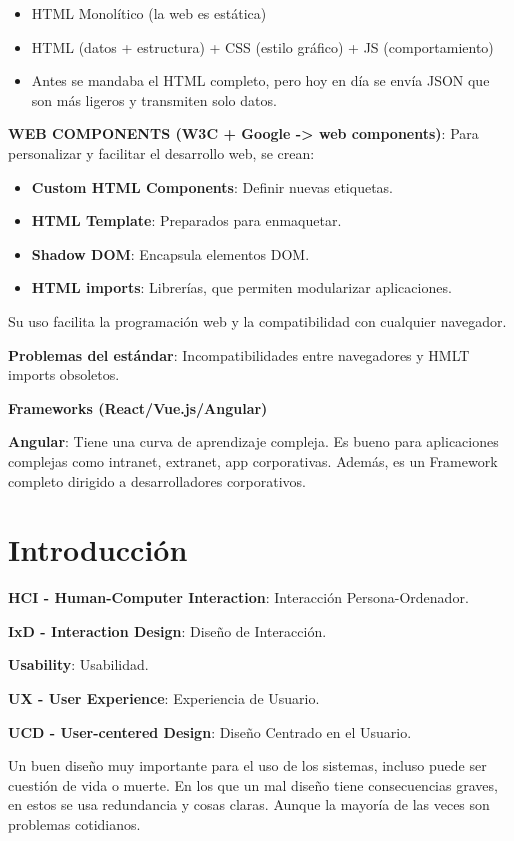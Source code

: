 \documentclass[12pt]{report} %
\begin{document}
\begin{itemize}
\item HTML Monolítico (la web es estática)
\item HTML (datos + estructura) + CSS (estilo gráfico) + JS (comportamiento)
\item Antes se mandaba el HTML completo, pero hoy en día se envía JSON que son más ligeros y transmiten solo datos.
\end{itemize}

\textbf{WEB COMPONENTS (W3C + Google -\textgreater{} web components)}:
Para personalizar y facilitar el desarrollo web, se crean:

\begin{itemize}
\item
  \textbf{Custom HTML Components}: Definir nuevas etiquetas.
\item
  \textbf{HTML Template}: Preparados para enmaquetar.
\item
  \textbf{Shadow DOM}: Encapsula elementos DOM.
\item
  \textbf{HTML imports}: Librerías, que permiten modularizar
  aplicaciones.
\end{itemize}

Su uso facilita la programación web y la compatibilidad con cualquier
navegador.

\textbf{Problemas del estándar}: Incompatibilidades entre navegadores y
HMLT imports obsoletos.

\textbf{Frameworks (React/Vue.js/Angular)}

\textbf{Angular}: Tiene una curva de aprendizaje compleja. Es bueno para aplicaciones complejas como intranet, extranet, app corporativas. Además, es un Framework completo dirigido a desarrolladores corporativos.

\chapter{Introducción}

\textbf{HCI - Human-Computer Interaction}: Interacción
Persona-Ordenador.

\textbf{IxD - Interaction Design}: Diseño de Interacción.

\textbf{Usability}: Usabilidad.

\textbf{UX - User Experience}: Experiencia de Usuario.

\textbf{UCD - User-centered Design}: Diseño Centrado en el Usuario.

Un buen diseño muy importante para el uso de los sistemas, incluso puede ser cuestión de vida o muerte. En los que un mal diseño tiene consecuencias graves, en estos se usa redundancia y cosas claras. Aunque la mayoría de las veces son problemas cotidianos.
\end{document}
